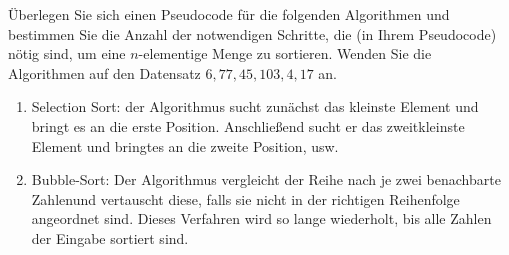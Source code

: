 
\begin{exercise}

Überlegen Sie sich einen Pseudocode für die folgenden Algorithmen und bestimmen Sie die Anzahl der notwendigen Schritte, die (in Ihrem Pseudocode) nötig sind, um eine $n$-elementige Menge zu sortieren.
Wenden Sie die Algorithmen auf den Datensatz $6, 77, 45, 103, 4, 17$ an.

\begin{enumerate}[label = (\alph*)]

    \item Selection Sort:
    der Algorithmus sucht zunächst das kleinste Element und bringt es an die erste Position.
    Anschließend sucht er das zweitkleinste Element und bringtes an die zweite Position, usw.

    \item Bubble-Sort:
    Der Algorithmus vergleicht der Reihe nach je zwei benachbarte Zahlenund vertauscht diese, falls sie nicht in der richtigen Reihenfolge angeordnet sind.
    Dieses Verfahren wird so lange wiederholt, bis alle Zahlen der Eingabe sortiert sind.

\end{enumerate}

\end{exercise}


